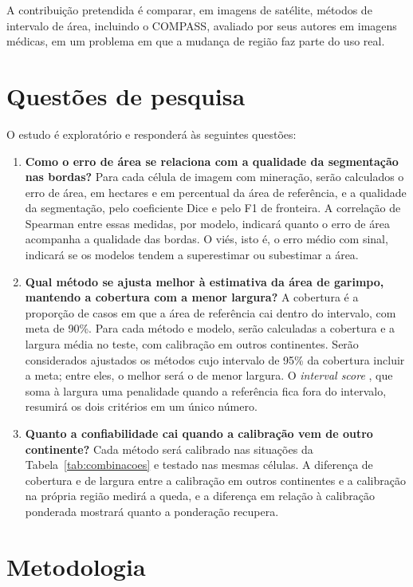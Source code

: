 \documentclass[11pt,a4paper]{article}
\begin{document}
A contribuição pretendida é comparar, em imagens de satélite, métodos de intervalo de área, incluindo o COMPASS, avaliado por
seus autores em imagens médicas, em um problema em que a mudança de região
faz parte do uso real.

\section{Questões de pesquisa}

O estudo é exploratório e responderá às seguintes questões:

\begin{enumerate}[leftmargin=*,label=Q\arabic*.]
  \item \textbf{Como o erro de área se relaciona com a qualidade da segmentação nas bordas?} Para cada célula de imagem com
  mineração, serão calculados o erro de área, em hectares e em percentual da área de referência, e a qualidade da segmentação,
  pelo coeficiente Dice e pelo F1 de fronteira. A correlação de Spearman entre essas medidas, por modelo, indicará quanto o erro
  de área acompanha a qualidade das bordas. O viés, isto é, o erro médio com sinal, indicará se os modelos tendem a superestimar
  ou subestimar a área.
  \item \textbf{Qual método se ajusta melhor à estimativa da área de garimpo, mantendo a cobertura com a menor largura?} A
  cobertura é a proporção de casos em que a área de referência cai dentro do intervalo, com meta de 90\%. Para cada método e
  modelo, serão calculadas a cobertura e a largura média no teste, com calibração em outros continentes. Serão considerados
  ajustados os métodos cujo intervalo de 95\% da cobertura incluir a meta; entre eles, o melhor será o de menor largura. O
  \emph{interval score} \cite{gneiting2007}, que soma à largura uma penalidade quando a referência fica fora do intervalo,
  resumirá os dois critérios em um único número.
  \item \textbf{Quanto a confiabilidade cai quando a calibração vem de outro continente?} Cada método será calibrado nas
  situações da Tabela~\ref{tab:combinacoes} e testado nas mesmas células. A diferença de cobertura e de largura entre a calibração
  em outros continentes e a calibração na própria região medirá a queda, e a diferença em relação à calibração ponderada mostrará
  quanto a ponderação recupera.
\end{enumerate}

\section{Metodologia}
\end{document}
